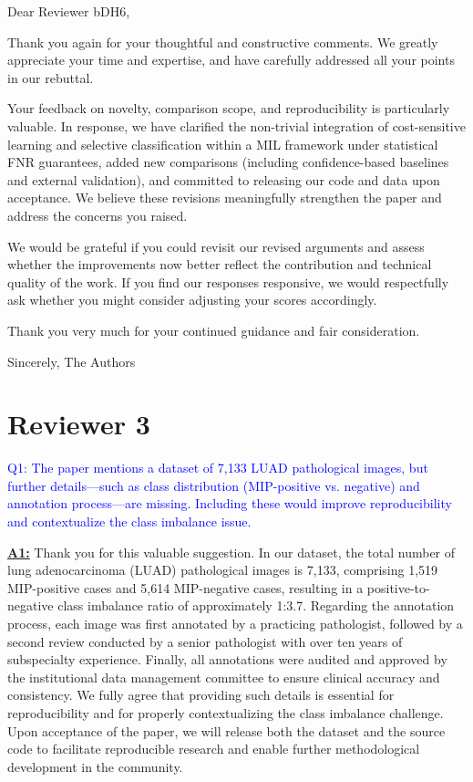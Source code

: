 \documentclass[UTF8,12pt]{article}
\begin{document}
\newpage

Dear Reviewer bDH6,

Thank you again for your thoughtful and constructive comments. We greatly appreciate your time and expertise, and have carefully addressed all your points in our rebuttal.

Your feedback on novelty, comparison scope, and reproducibility is particularly valuable. In response, we have clarified the non-trivial integration of cost-sensitive learning and selective classification within a MIL framework under statistical FNR guarantees, added new comparisons (including confidence-based baselines and external validation), and committed to releasing our code and data upon acceptance. We believe these revisions meaningfully strengthen the paper and address the concerns you raised.

We would be grateful if you could revisit our revised arguments and assess whether the improvements now better reflect the contribution and technical quality of the work. If you find our responses responsive, we would respectfully ask whether you might consider adjusting your scores accordingly.

Thank you very much for your continued guidance and fair consideration.

Sincerely,
The Authors

\newpage

\section*{Reviewer 3}

\textcolor{blue}{Q1: The paper mentions a dataset of 7,133 LUAD pathological images, but further details—such as class distribution (MIP-positive vs. negative) and annotation process—are missing. Including these would improve reproducibility and contextualize the class imbalance issue.}

\underline{{\bf A1:}} Thank you for this valuable suggestion. In our dataset, the total number of lung adenocarcinoma (LUAD) pathological images is 7,133, comprising 1,519 MIP-positive cases and 5,614 MIP-negative cases, resulting in a positive-to-negative class imbalance ratio of approximately 1:3.7. Regarding the annotation process, each image was first annotated by a practicing pathologist, followed by a second review conducted by a senior pathologist with over ten years of subspecialty experience. Finally, all annotations were audited and approved by the institutional data management committee to ensure clinical accuracy and consistency. We fully agree that providing such details is essential for reproducibility and for properly contextualizing the class imbalance challenge. Upon acceptance of the paper, we will release both the dataset and the source code to facilitate reproducible research and enable further methodological development in the community.
\end{document}
